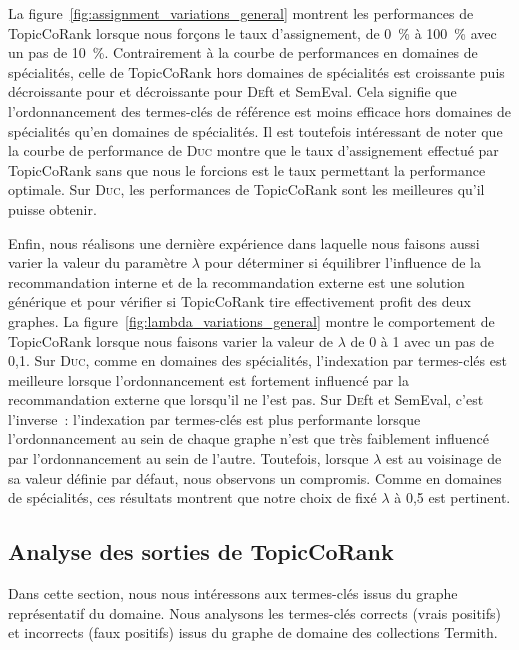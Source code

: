         La figure~\ref{fig:assignment_variations_general} montrent les
        performances de TopicCoRank lorsque nous forçons le taux d'assignement,
        de 0~\% à 100~\% avec un pas de 10~\%. Contrairement à la courbe de
        performances en domaines de spécialités, celle de TopicCoRank hors
        domaines de spécialités est croissante puis décroissante pour 
        et décroissante pour \textsc{De}ft et SemEval. Cela signifie que
        l'ordonnancement des termes-clés de référence est moins efficace hors
        domaines de spécialités qu'en domaines de spécialités. Il est toutefois
        intéressant de noter que la courbe de performance de \textsc{Duc} montre
        que le taux d'assignement effectué par TopicCoRank sans que nous le
        forcions est le taux permettant la performance optimale. Sur
        \textsc{Duc}, les performances de TopicCoRank sont les meilleures qu'il
        puisse obtenir.
        

        Enfin, nous réalisons une dernière expérience dans laquelle nous faisons
        aussi varier la valeur du paramètre $\lambda$ pour déterminer si
        équilibrer l'influence de la recommandation interne et de la
        recommandation externe est une solution générique et pour vérifier si
        TopicCoRank tire effectivement profit des deux graphes. La
        figure~\ref{fig:lambda_variations_general}
        montre le comportement de TopicCoRank lorsque nous faisons varier la
        valeur de $\lambda$ de 0 à 1 avec un pas de 0,1. Sur \textsc{Duc}, comme
        en domaines des spécialités, l'indexation par termes-clés est meilleure
        lorsque l'ordonnancement est fortement influencé par la recommandation
        externe que lorsqu'il ne l'est pas. Sur \textsc{De}ft et SemEval, c'est
        l'inverse~: l'indexation par termes-clés est plus performante lorsque
        l'ordonnancement au sein de chaque graphe n'est que très faiblement
        influencé par l'ordonnancement au sein de l'autre. Toutefois, lorsque
        $\lambda$ est au voisinage de sa valeur définie par défaut, nous
        observons un compromis. Comme en domaines de spécialités, ces résultats
        montrent que notre choix de fixé $\lambda$ à 0,5 est pertinent.
        

    \subsection{Analyse des sorties de TopicCoRank}
    \label{subsec:main-domain_specific_keyphrase_annotation-supervised_automatic_keyphrase_annotation-error_analysis}
      Dans cette section, nous nous intéressons aux termes-clés issus du graphe
      représentatif du domaine. Nous analysons les termes-clés corrects (vrais
      positifs) et incorrects (faux positifs) issus du graphe de domaine des
      collections Termith.

